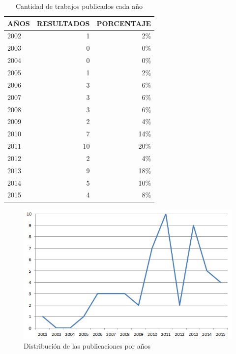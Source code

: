 \begin{table}
  \begin{center}
  \begin{tabular}{| m{4cm} | r | r |}
    \hline
    AÑOS & RESULTADOS & PORCENTAJE\\
    \hline    
    \hline
    2002 & 1 & 2\% \\
    \hline
    2003 & 0 & 0\% \\
    \hline
    2004 & 0 & 0\%\\
    \hline
    2005 & 1 & 2\%\\
    \hline
    2006 & 3 & 6\%\\
    \hline
    2007 & 3 & 6\%\\
    \hline
    2008 & 3 & 6\%\\
    \hline
    2009 & 2 & 4\%\\
    \hline
    2010 & 7 & 14\%\\
    \hline
    2011 & 10 & 20\%\\
    \hline
    2012 & 2 & 4\%\\
    \hline
    2013 & 9 & 18\% \\
    \hline
    2014 & 5 & 10\%\\
    \hline
    2015 & 4 & 8\% \\
    \hline
  \end{tabular}
\end{center}
\caption{Cantidad de trabajos publicados cada año}
\label{tab:ResumenAniosResultados}
\end{table}

\begin{figure}
  \begin{center}
    \includegraphics[scale=0.6]{PublicacionesAnuales.png}
  \end{center}
  \caption{Distribución de las publicaciones por años}
  \label{fig:PublicacionesAnuales}
\end{figure}

